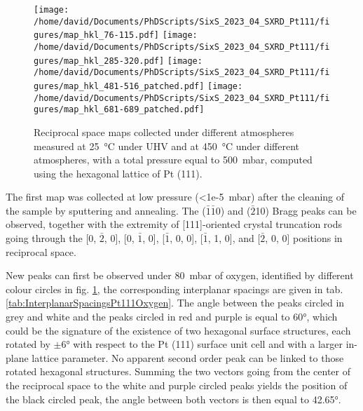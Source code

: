 
\begin{figure}[!htb]
    \centering
    \texttt{[image: /home/david/Documents/PhDScripts/SixS\_2023\_04\_SXRD\_Pt111/figures/map\_hkl\_76-115.pdf]}
    \texttt{[image: /home/david/Documents/PhDScripts/SixS\_2023\_04\_SXRD\_Pt111/figures/map\_hkl\_285-320.pdf]}
    \texttt{[image: /home/david/Documents/PhDScripts/SixS\_2023\_04\_SXRD\_Pt111/figures/map\_hkl\_481-516\_patched.pdf]}
    \texttt{[image: /home/david/Documents/PhDScripts/SixS\_2023\_04\_SXRD\_Pt111/figures/map\_hkl\_681-689\_patched.pdf]}
    \caption{
        Reciprocal space maps collected under different atmospheres measured at \qty{25}{\degreeCelsius} under UHV and at \qty{450}{\degreeCelsius} under different atmospheres, with a total pressure equal to \qty{500}{\milli\bar}, computed using the hexagonal lattice of Pt (111).
    }
    \label{fig:MapsPt111A}
\end{figure}

The first map was collected at low pressure (\qty{<1e-5}{\milli\bar}) after the cleaning of the sample by sputtering and annealing.
The ($\bar{1}$$\bar{1}$0) and ($\bar{2}$10) Bragg peaks can be observed, together with the extremity of [111]-oriented crystal truncation rods going through the [0, $\bar{2}$, 0], [0, $\bar{1}$, 0], [$\bar{1}$, 0, 0], [$\bar{1}$, 1, 0], and [$\bar{2}$, 0, 0] positions in reciprocal space.

New peaks can first be observed under \qty{80}{\milli\bar} of oxygen, identified by different colour circles in fig. \ref{fig:MapsPt111A}, the corresponding interplanar spacings are given in tab. \ref{tab:InterplanarSpacingsPt111Oxygen}.
The angle between the peaks circled in grey and white and the peaks circled in red and purple is equal to \ang{60}, which could be the signature of the existence of two hexagonal surface structures, each rotated by $\pm \ang{6}$ with respect to the Pt (111) surface unit cell and with a larger in-plane lattice parameter.
No apparent second order peak can be linked to those rotated hexagonal structures.
Summing the two vectors going from the center of the reciprocal space to the white and purple circled peaks yields the position of the black circled peak, the angle between both vectors is then equal to \ang{42.65}.

